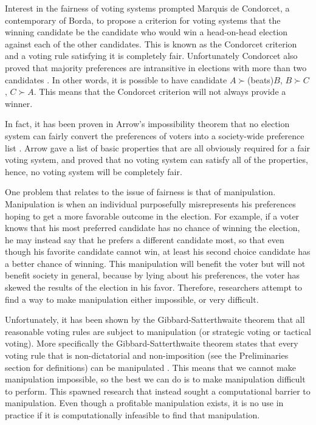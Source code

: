 Interest in the fairness of voting systems prompted Marquis de Condorcet, a contemporary of Borda, to propose a criterion for voting systems that the winning candidate be the candidate who would win a head-on-head election against each of the other candidates. This is known as the Condorcet criterion and a voting rule satisfying it is completely fair. Unfortunately Condorcet also proved that majority preferences are intransitive in elections with more than two candidates \cite{le1785essai, black1998theory}. In other words, it is possible to have candidate $A \succ $(beats)$ B$, $B \succ C$, $C \succ A$. This means that the Condorcet criterion will not always provide a winner.

In fact, it has been proven in Arrow's impossibility theorem that no election system can fairly convert the preferences of voters into a society-wide preference list \cite{arrow1950difficulty}. Arrow gave a list of basic properties that are all obviously required for a fair voting system, and proved that no voting system can satisfy all of the properties, hence, no voting system will be completely fair.

One problem that relates to the issue of fairness is that of manipulation. Manipulation is when an individual purposefully misrepresents his preferences hoping to get a more favorable outcome in the election. For example, if a voter knows that his most preferred candidate has no chance of winning the election, he may instead say that he prefers a different candidate most, so that even though his favorite candidate cannot win, at least his second choice candidate has a better chance of winning. This manipulation will benefit the voter but will not benefit society in general, because by lying about his preferences, the voter has skewed the results of the election in his favor. Therefore, researchers attempt to find a way to make manipulation either impossible, or very difficult.

Unfortunately, it has been shown by the Gibbard-Satterthwaite theorem that all reasonable voting rules are subject to manipulation (or strategic voting or tactical voting). More specifically the Gibbard-Satterthwaite theorem states that every voting rule that is non-dictatorial and non-imposition (see the Preliminaries section for definitions) can be manipulated \cite{gibbard1973manipulation, satterthwaite1975strategy, duggan2000strategic}. This means that we cannot make manipulation impossible, so the best we can do is to make manipulation difficult to perform. This spawned research that instead sought a computational barrier to manipulation. Even though a profitable manipulation exists, it is no use in practice if it is computationally infeasible to find that manipulation.

